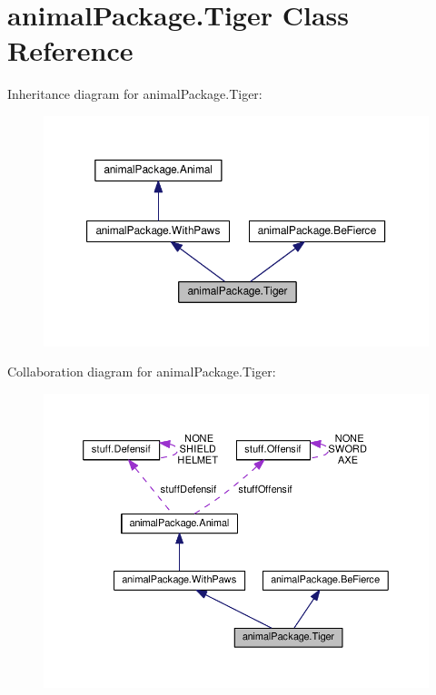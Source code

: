 \hypertarget{classanimal_package_1_1_tiger}{}\section{animal\+Package.\+Tiger Class Reference}
\label{classanimal_package_1_1_tiger}


Inheritance diagram for animal\+Package.\+Tiger\+:\nopagebreak
\begin{figure}[H]
\begin{center}
\leavevmode
\includegraphics[width=350pt]{classanimal_package_1_1_tiger__inherit__graph}
\end{center}
\end{figure}


Collaboration diagram for animal\+Package.\+Tiger\+:\nopagebreak
\begin{figure}[H]
\begin{center}
\leavevmode
\includegraphics[width=350pt]{classanimal_package_1_1_tiger__coll__graph}
\end{center}
\end{figure}
